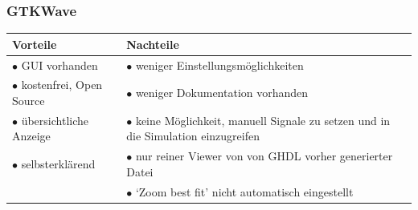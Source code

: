 \documentclass[a4paper, 11pt]{article}
\theoremstyle{definition}
\theoremstyle{plain}
\begin{document}
\subsubsection{GTKWave}

\begin{tabular}{p{7cm}|p{7cm}}
\textbf{Vorteile} & \textbf{Nachteile} \\
\hline 
$\bullet$ GUI vorhanden & $\bullet$ weniger Einstellungsmöglichkeiten \\
$\bullet$ kostenfrei, Open Source & $\bullet$ weniger Dokumentation vorhanden \\
$\bullet$ übersichtliche Anzeige & $\bullet$ keine Möglichkeit, manuell Signale zu setzen und in die Simulation einzugreifen \\
$\bullet$  selbsterklärend & $\bullet$ nur reiner Viewer von von GHDL vorher generierter Datei \\
 & $\bullet$ `Zoom best fit' nicht automatisch eingestellt
\end{tabular}
\end{document}
